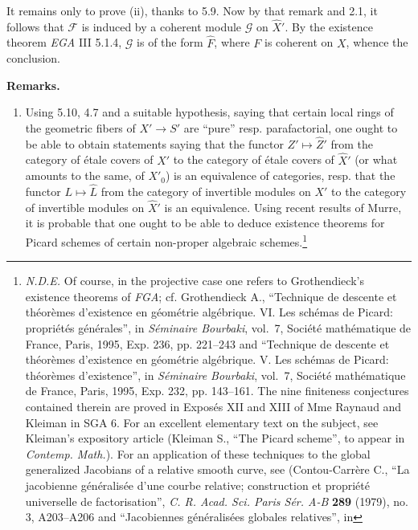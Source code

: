 \documentclass[
]{article}
\begin{document}
It remains only to prove (ii), thanks to 5.9. Now by that remark and
2.1, it follows that \(\mathcal{F}\) is induced by a coherent module
\(\mathcal{G}\) on \(\hat{X}'\). By the existence theorem \emph{EGA} III
5.1.4, \(\mathcal{G}\) is of the form \(\hat{F}\), where \(F\) is
coherent on \(X\), whence the conclusion.

\textbf{Remarks.}

\begin{enumerate}
\def\labelenumi{\arabic{enumi}.}
\item
  Using 5.10, 4.7 and a suitable hypothesis, saying that certain local
  rings of the geometric fibers of \(X' \to S'\) are ``pure'' resp.
  parafactorial, one ought to be able to obtain statements saying that
  the functor \(Z' \mapsto \hat{Z}'\) from the category of étale covers
  of \(X'\) to the category of étale covers of \(\hat{X}'\) (or what
  amounts to the same, of \(X'_{0}\)) is an equivalence of categories,
  resp. that the functor \(L \mapsto \hat{L}\) from the category of
  invertible modules on \(X'\) to the category of invertible modules on
  \(\hat{X}'\) is an equivalence. Using recent results of Murre, it is
  probable that one ought to be able to deduce existence theorems for
  Picard schemes of certain non-proper algebraic schemes.\footnote{\emph{N.D.E.}
    Of course, in the projective case one refers to Grothendieck's
    existence theorems of \emph{FGA}; cf. Grothendieck A., ``Technique
    de descente et théorèmes d'existence en géométrie algébrique. VI.
    Les schémas de Picard: propriétés générales'', in \emph{Séminaire
    Bourbaki}, vol.~7, Société mathématique de France, Paris, 1995, Exp.
    236, pp. 221--243 and ``Technique de descente et théorèmes
    d'existence en géométrie algébrique. V. Les schémas de Picard:
    théorèmes d'existence'', in \emph{Séminaire Bourbaki}, vol.~7,
    Société mathématique de France, Paris, 1995, Exp. 232, pp. 143--161.
    The nine finiteness conjectures contained therein are proved in
    Exposés XII and XIII of Mme Raynaud and Kleiman in SGA 6. For an
    excellent elementary text on the subject, see Kleiman's expository
    article (Kleiman S., ``The Picard scheme'', to appear in
    \emph{Contemp. Math.}). For an application of these techniques to
    the global generalized Jacobians of a relative smooth curve, see
    (Contou-Carrère C., ``La jacobienne généralisée d'une courbe
    relative; construction et propriété universelle de factorisation'',
    \emph{C. R. Acad. Sci. Paris Sér. A-B} \textbf{289} (1979), no. 3,
    A203--A206 and ``Jacobiennes généralisées globales relatives'', in
}
\end{enumerate}
\end{document}
